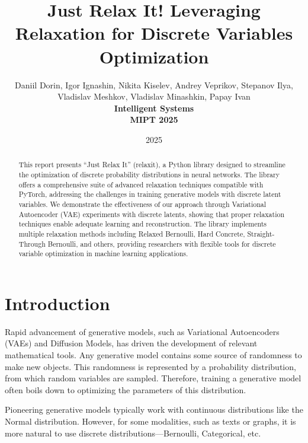 \documentclass[peerreview]{IEEEtran}
\begin{document}
\title{Just Relax It! Leveraging Relaxation for Discrete Variables Optimization}

\author{Daniil Dorin, Igor Ignashin, Nikita Kiselev, Andrey Veprikov, Stepanov Ilya, Vladislav Meshkov, Vladislav Minashkin, Papay Ivan \\
\textbf{Intelligent Systems}\\
\textbf{MIPT 2025}}

\date{2025}

\maketitle
\tableofcontents
\listoffigures
\listoftables

\IEEEpeerreviewmaketitle

\begin{abstract}
This report presents ``Just Relax It'' (relaxit), a Python library designed to streamline the optimization of discrete probability distributions in neural networks. The library offers a comprehensive suite of advanced relaxation techniques compatible with PyTorch, addressing the challenges in training generative models with discrete latent variables. We demonstrate the effectiveness of our approach through Variational Autoencoder (VAE) experiments with discrete latents, showing that proper relaxation techniques enable adequate learning and reconstruction. The library implements multiple relaxation methods including Relaxed Bernoulli, Hard Concrete, Straight-Through Bernoulli, and others, providing researchers with flexible tools for discrete variable optimization in machine learning applications.
\end{abstract}

\section{Introduction}
Rapid advancement of generative models, such as Variational Autoencoders (VAEs) and Diffusion Models, has driven the development of relevant mathematical tools. Any generative model contains some source of randomness to make new objects. This randomness is represented by a probability distribution, from which random variables are sampled. Therefore, training a generative model often boils down to optimizing the parameters of this distribution.

Pioneering generative models typically work with continuous distributions like the Normal distribution. However, for some modalities, such as texts or graphs, it is more natural to use discrete distributions—Bernoulli, Categorical, etc.
\end{document}
